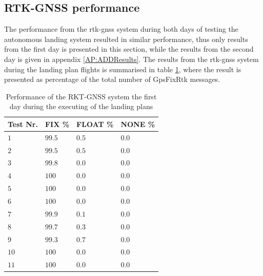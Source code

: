 \subsection{RTK-GNSS performance}
The performance from the \gls{rtk-gnss} system during both days of testing the autonomous landing system resulted in similar performance, thus only results from the first day is presented in this section, while the results from the second day is given in appendix \ref{AP:ADDResults}. The results from the \gls{rtk-gnss} system during the landing plan flights is summarised in table \ref{TB:RTKFirstDayRTK}, where the result is presented as percentage of the total number of GpsFixRtk messages.
\begin{table}[H]
\centering
\begin{tabular}{| l | l | l | l |}
\hline
\textbf{Test Nr.}	& \textbf{FIX \%}	& \textbf{FLOAT \%}	& \textbf{NONE \%}	\\ \hline
$1$				& $99.5 $	& $0.5$	& $0.0$									\\ \hline
$2$				& $99.5 $	& $0.5$	& $0.0$									\\ \hline
$3$				& $99.8 $	& $0.0$	& $0.0$									\\ \hline
$4$				& $100$		& $0.0$	& $0.0$									\\ \hline
$5$				& $100$		& $0.0$	& $0.0$									\\ \hline
$6$				& $100$		& $0.0$	& $0.0$									\\ \hline
$7$				& $99.9$	& $0.1$	& $0.0$									\\ \hline
$8$				& $99.7 $ 	& $0.3$	& $0.0$									\\ \hline
$9$				& $99.3$	& $0.7$	& $0.0$									\\ \hline
$10$			& $100$		& $0.0$	& $0.0$									\\ \hline
$11$			& $100$		& $0.0$	& $0.0$									\\ \hline
\end{tabular}
\caption{Performance of the RKT-GNSS system the first day during the executing of the landing plans}
\label{TB:RTKFirstDayRTK}
\end{table}
